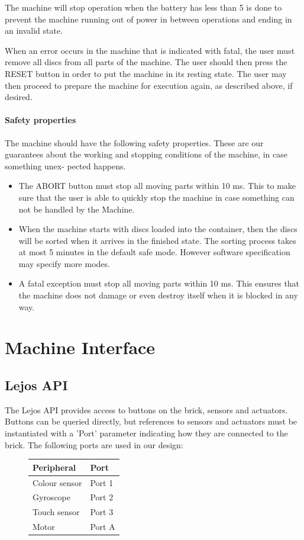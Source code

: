 \documentclass[a4paper,oneside,11pt]{article}
\begin{document}
The machine will stop operation when the battery has less than 5%
is done to prevent the machine running out of power in between operations and ending in an
invalid state.

When an error occurs in the machine that is indicated with fatal, the user must remove all
discs from all parts of the machine. The user should then press the RESET button in order
to put the machine in its resting state. The user may then proceed to prepare the machine for
execution again, as described above, if desired.

\paragraph{Safety properties}
The machine should have the following safety properties. These are our
guarantees about the working and stopping conditions of the machine, in case something unex-
pected happens.

\begin{itemize}
	\item The ABORT button must stop all moving parts within 10 ms. This to make sure that the user is able to quickly stop the machine in case something can not be handled by the Machine.
	\item When the machine starts with discs loaded into the container, then the discs will be sorted
when it arrives in the finished state. The sorting process takes at most 5 minutes in the
default safe mode. However software specification may specify more modes.
	\item A fatal exception must stop all moving parts within 10 ms. This ensures that the machine
does not damage or even destroy itself when it is blocked in any way.
\end{itemize}

\section{Machine Interface}
\subsection{Lejos API}
The Lejos API provides access to buttons on the brick, sensors and actuators.
Buttons can be queried directly, but references to sensors and actuators must be instantiated
with a ’Port’ parameter indicating how they are connected to the brick. The following ports
are used in our design:

\begin{figure}[H]
\begin{tabular}{|l|l|}
\hline
\textbf{Peripheral} & \textbf{Port} \\
\hline
Colour sensor & Port 1 \\
Gyroscope & Port 2 \\
Touch sensor & Port 3 \\
Motor & Port A \\
\hline
\end{tabular}
\end{figure}
\end{document}
